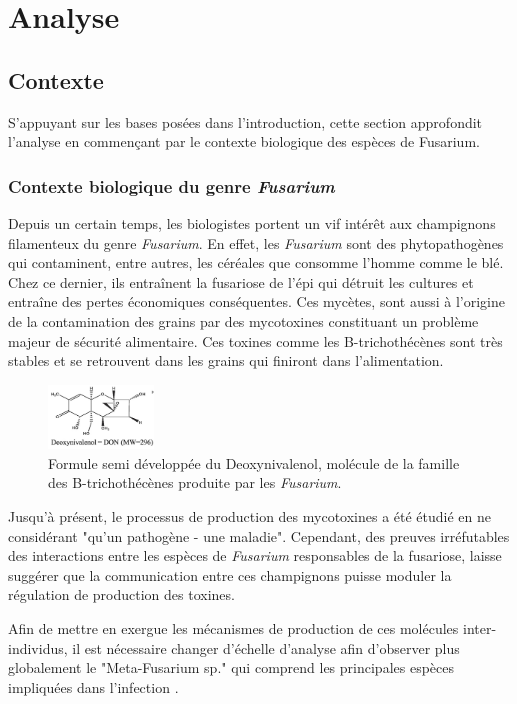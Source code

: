 \chapter{Analyse}
\section{Contexte}
S'appuyant sur les bases posées dans l'introduction, cette section approfondit l'analyse en commençant par le contexte biologique des espèces de Fusarium.
\subsection{Contexte biologique du genre \textit{Fusarium}}
Depuis un certain temps, les biologistes portent un vif intérêt aux champignons filamenteux du genre \textit{Fusarium}. En effet, les \textit{Fusarium} sont des phytopathogènes qui contaminent, entre autres, les céréales que consomme l’homme comme le blé. Chez ce dernier, ils entraînent la fusariose de l'épi qui détruit les cultures et entraîne des pertes économiques conséquentes. Ces mycètes, sont aussi à l’origine de la contamination des grains par des mycotoxines constituant un problème majeur de sécurité alimentaire. Ces toxines comme les B-trichothécènes sont très stables et se retrouvent dans les grains qui finiront dans l’alimentation.\\

\begin{figure}
    \centering
    \includegraphics[width=0.25\textwidth]{img/fig_1.png}
    \caption{Formule semi développée du Deoxynivalenol, molécule de la famille des B-trichothécènes produite par les \textit{Fusarium}\cite{gaballah2023development}.}
    \label{fig:mol}
\end{figure}

Jusqu’à présent, le processus de production des mycotoxines a été étudié en ne considérant "qu’un pathogène - une maladie". Cependant, des preuves irréfutables des interactions entre les espèces de \textit{Fusarium} responsables de la fusariose, laisse suggérer que la communication entre ces champignons puisse moduler la régulation de production des toxines.

Afin de mettre en exergue les mécanismes de production de ces molécules inter-individus, il est nécessaire changer d'échelle d'analyse afin d’observer plus globalement le "Meta-Fusarium sp." qui comprend les principales espèces impliquées dans l’infection \cite{ponts2009fusarium, mycsa}. \\

